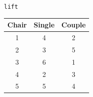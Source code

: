 \begin{center}
\lstinline{lift}

\begin{tabular}{|c|c|c|}
 \hline
 \textbf{Chair} & \textbf{Single} & \textbf{Couple} \\
 \hline
 1 & 4 & 2 \\
 \hline
 2 & 3 & 5 \\
 \hline
 3 & 6 & 1 \\
 \hline
 4 & 2 & 3 \\
 \hline
 5 & 5 & 4 \\
 \hline
\end{tabular}
\end{center}
